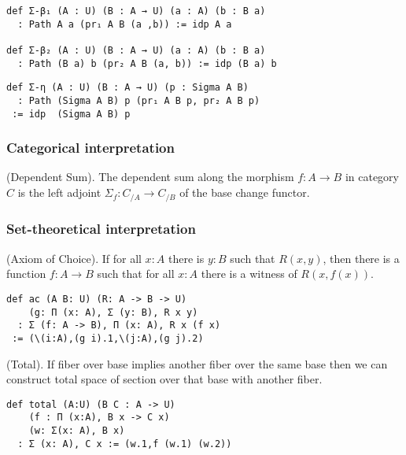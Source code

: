 \documentclass{article}
\begin{document}
\begin{theorem} 
\begin{lstlisting}[mathescape=true]
def Σ-β₁ (A : U) (B : A → U) (a : A) (b : B a)
  : Path A a (pr₁ A B (a ,b)) := idp A a

def Σ-β₂ (A : U) (B : A → U) (a : A) (b : B a)
  : Path (B a) b (pr₂ A B (a, b)) := idp (B a) b
\end{lstlisting}
\end{theorem}

\begin{theorem} 
\begin{lstlisting}
def Σ-η (A : U) (B : A → U) (p : Sigma A B)
  : Path (Sigma A B) p (pr₁ A B p, pr₂ A B p)
 := idp  (Sigma A B) p
\end{lstlisting}
\end{theorem}

\subsubsection*{Categorical interpretation}

\begin{definition} (Dependent Sum).
The dependent sum along the morphism $f: A \rightarrow B$ in category $C$ is the left
adjoint $\Sigma_f : C_{/A} \rightarrow C_{/B}$ of the base change functor.
\end{definition}

\subsubsection*{Set-theoretical interpretation}

\begin{theorem} (Axiom of Choice).
If for all $x : A$ there is $y : B$ such that $R(x,y)$,
then there is a function $f : A \rightarrow B$
such that for all $x : A$ there is a witness of $R(x,f(x))$.
\begin{lstlisting}
def ac (A B: U) (R: A -> B -> U)
    (g: Π (x: A), Σ (y: B), R x y)
  : Σ (f: A -> B), Π (x: A), R x (f x)
 := (\(i:A),(g i).1,\(j:A),(g j).2)
\end{lstlisting}
\end{theorem}

\begin{theorem} (Total).
If fiber over base implies another fiber
over the same base then we can construct total space of section
over that base with another fiber.
\begin{lstlisting}
def total (A:U) (B C : A -> U)
    (f : Π (x:A), B x -> C x)
    (w: Σ(x: A), B x)
  : Σ (x: A), C x := (w.1,f (w.1) (w.2))
\end{lstlisting}
\end{theorem}
\end{document}
